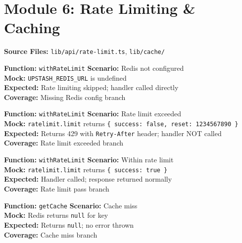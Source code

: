 \documentclass[12pt,a4paper]{report}
\newcommand{\ptwo}{\textbf{\color{p2orange}P2}}
\newcommand{\pthree}{\textbf{\color{p3blue}P3}}
\begin{document}
\section{Module 6: Rate Limiting \& Caching}

\textbf{Source Files:} \texttt{lib/api/rate-limit.ts}, \texttt{lib/cache/}

\begin{tcolorbox}[testbox,title={RATE-001 \hfill \ptwo}]
\textbf{Function:} \texttt{withRateLimit} \quad \textbf{Scenario:} Redis not configured \\
\textbf{Mock:} \texttt{UPSTASH\_REDIS\_URL} is undefined \\
\textbf{Expected:} Rate limiting skipped; handler called directly \\
\textbf{Coverage:} Missing Redis config branch
\end{tcolorbox}

\begin{tcolorbox}[testbox,title={RATE-002 \hfill \ptwo}]
\textbf{Function:} \texttt{withRateLimit} \quad \textbf{Scenario:} Rate limit exceeded \\
\textbf{Mock:} \texttt{ratelimit.limit} returns \texttt{\{ success: false, reset: 1234567890 \}} \\
\textbf{Expected:} Returns 429 with \texttt{Retry-After} header; handler NOT called \\
\textbf{Coverage:} Rate limit exceeded branch
\end{tcolorbox}

\begin{tcolorbox}[testbox,title={RATE-003 \hfill \ptwo}]
\textbf{Function:} \texttt{withRateLimit} \quad \textbf{Scenario:} Within rate limit \\
\textbf{Mock:} \texttt{ratelimit.limit} returns \texttt{\{ success: true \}} \\
\textbf{Expected:} Handler called; response returned normally \\
\textbf{Coverage:} Rate limit pass branch
\end{tcolorbox}

\begin{tcolorbox}[testbox,title={CACHE-001 \hfill \pthree}]
\textbf{Function:} \texttt{getCache} \quad \textbf{Scenario:} Cache miss \\
\textbf{Mock:} Redis returns \texttt{null} for key \\
\textbf{Expected:} Returns \texttt{null}; no error thrown \\
\textbf{Coverage:} Cache miss branch
\end{tcolorbox}
\end{document}
